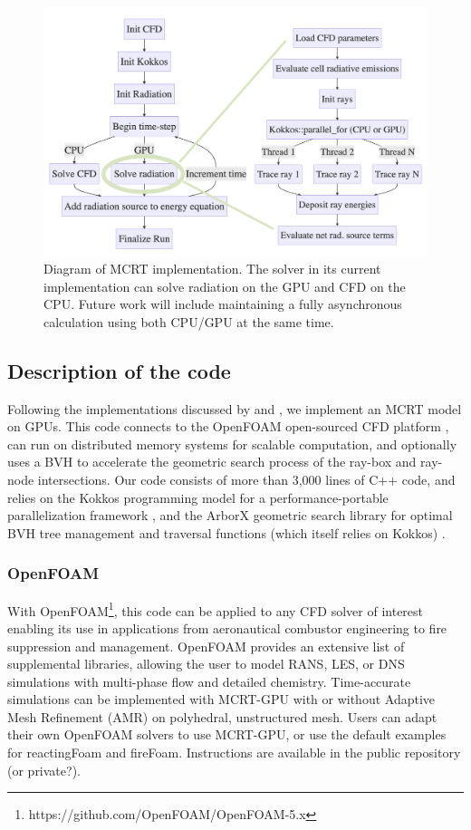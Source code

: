 \begin{figure}
  \includegraphics[width=\linewidth]{figures/ch3/joint_flow_chart.png}
  \caption{Diagram of MCRT implementation. The solver in its current implementation can solve radiation on the GPU and CFD on the CPU. Future work will include maintaining a fully asynchronous calculation using both CPU/GPU at the same time.}
  \label{fig:joint_flow_chart}
\end{figure}

\subsection{Description of the code}
Following the implementations discussed by \citet{Silvestri2019ASimulation} and \citet{Humphrey2015ATracing}, we implement an MCRT model on GPUs. 
This code connects to the OpenFOAM open-sourced CFD platform \cite{Weller1998ATechniques}, can run on distributed memory systems for scalable computation, and optionally uses a BVH to accelerate the geometric search process of the ray-box and ray-node intersections.
Our code consists of more than 3,000 lines of C++ code, and relies on the Kokkos programming model for a performance-portable parallelization framework \cite{Trott2021KokkosEra}, and the ArborX geometric search library for optimal BVH tree management and traversal functions (which itself relies on Kokkos) \cite{Lebrun-Grandie2019ArborX:Library}.


\subsubsection{OpenFOAM}
With OpenFOAM\footnote{https://github.com/OpenFOAM/OpenFOAM-5.x}, this code can be applied to any CFD solver of interest enabling its use in applications from aeronautical combustor engineering to fire suppression and management. OpenFOAM provides an extensive list of supplemental libraries, allowing the user to model RANS, LES, or DNS simulations with multi-phase flow and detailed chemistry. 
Time-accurate simulations can be implemented with MCRT-GPU with or without Adaptive Mesh Refinement (AMR) on polyhedral, unstructured mesh.
Users can adapt their own OpenFOAM solvers to use MCRT-GPU, or use the default examples for reactingFoam and fireFoam. Instructions are available in the public repository (or private?).

